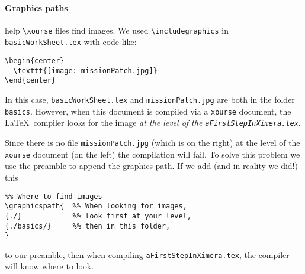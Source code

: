 \documentclass{ximera}
\begin{document}
\paragraph{Graphics paths} help \verb!\xourse! files find images. 
We used \verb!\includegraphics! in \texttt{basicWorkSheet.tex} with code like:
\begin{verbatim} 
\begin{center}
  \texttt{[image: missionPatch.jpg]}
\end{center}
\end{verbatim}
In this case, \texttt{basicWorkSheet.tex}  and \verb!missionPatch.jpg! are both in the folder
\texttt{basics}. However, when
this document is compiled via a \verb!xourse! document, the \LaTeX\ compiler
looks for the image \textit{at the level of the
  \texttt{aFirstStepInXimera.tex}}.
\begin{center}%
\end{center}
Since there is no file \verb!missionPatch.jpg! (which is on the right) at the
level of the
\verb!xourse! document (on the left) the compilation will fail. To solve this
problem we use the preamble to append the graphics path. If we add (and in
reality we did!) this
\begin{verbatim}
%% Where to find images
\graphicspath{  %% When looking for images,
{./}            %% look first at your level,
{./basics/}     %% then in this folder,
}    
\end{verbatim}
to our preamble, then when compiling \verb!aFirstStepInXimera.tex!, the
compiler will know where to look.
\end{document}
